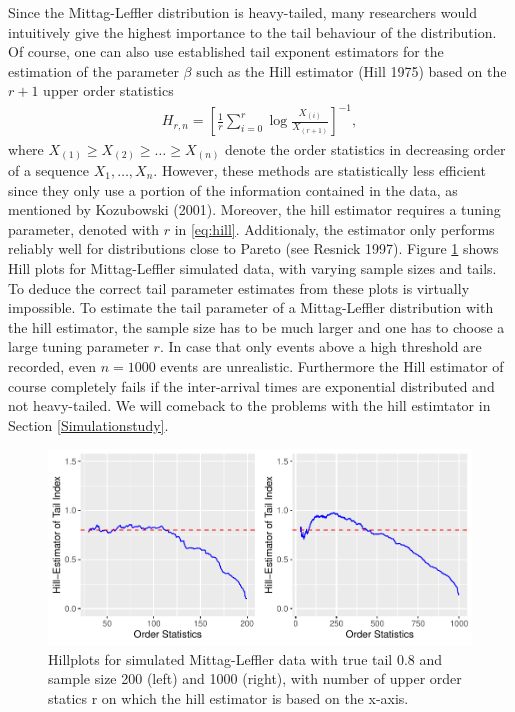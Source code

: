 \documentclass[]{elsarticle} %
\begin{document}
Since the Mittag-Leffler distribution is heavy-tailed, many researchers
would intuitively give the highest importance to the tail behaviour of
the distribution. Of course, one can also use established tail exponent
estimators for the estimation of the parameter \(\beta\) such as the
Hill estimator (Hill 1975) based on the \(r+1\) upper order statistics
\begin{align}\label{eq:hill}
H_{r,n}=\left[ \frac{1}{r} \sum_{i=0}^{r} \log \frac{X_{(i)}}{X_{(r+1)}}\right]^{-1}, 
\end{align} where \(X_{(1)} \geq X_{(2)} \geq \ldots \geq X_{(n)}\)
denote the order statistics in decreasing order of a sequence
\(X_1,\ldots,X_n\). However, these methods are statistically less
efficient since they only use a portion of the information contained in
the data, as mentioned by Kozubowski (2001). Moreover, the hill
estimator requires a tuning parameter, denoted with \(r\) in
\eqref{eq:hill}. Additionaly, the estimator only performs reliably well
for distributions close to Pareto (see Resnick 1997). Figure
\ref{fig:Hillplots} shows Hill plots for Mittag-Leffler simulated data,
with varying sample sizes and tails. To deduce the correct tail
parameter estimates from these plots is virtually impossible. To
estimate the tail parameter of a Mittag-Leffler distribution with the
hill estimator, the sample size has to be much larger and one has to
choose a large tuning parameter \(r\). In case that only events above a
high threshold are recorded, even \(n=1000\) events are unrealistic.
Furthermore the Hill estimator of course completely fails if the
inter-arrival times are exponential distributed and not heavy-tailed. We
will comeback to the problems with the hill estimtator in Section
\ref{Simulationstudy}.

\begin{figure}

{\centering \includegraphics[width=0.9\linewidth]{article_springer_files/figure-latex/Hillplots-1} 

}

\caption{\label{fig:Hillplots} Hillplots for simulated Mittag-Leffler data with true tail 0.8 and sample size 200 (left) and 1000 (right), with number of upper order statics r on which the hill estimator is based on the x-axis. }\label{fig:Hillplots}
\end{figure}
\end{document}
